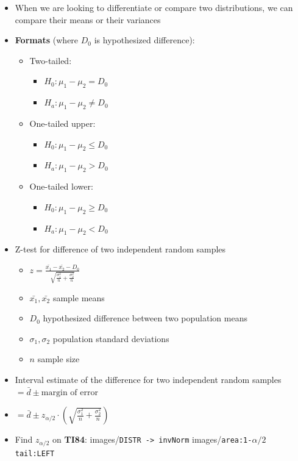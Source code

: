 \documentclass{article}
\newcommand{\code}[1]{images/\colorbox{light-gray}{\texttt{#1}}}
\begin{document}
\begin{itemize}
    \item When we are looking to differentiate or compare two distributions, we can compare their means or their variances
    \item \textbf{Formats} (where $D_0$ is hypothesized difference):
    \begin{itemize}
        \item Two-tailed:
        \begin{itemize}
            \item $H_0: \mu_1 - \mu_2 = D_0$
            \item $H_a: \mu_1 - \mu_2 \ne D_0$
        \end{itemize}
        \item One-tailed upper:
        \begin{itemize}
            \item $H_0: \mu_1 - \mu_2 \leq D_0$
            \item $H_a: \mu_1 - \mu_2 > D_0$
        \end{itemize}
        \item One-tailed lower:
        \begin{itemize}
            \item $H_0: \mu_1 - \mu_2 \geq D_0$
            \item $H_a: \mu_1 - \mu_2 < D_0$
        \end{itemize}
    \end{itemize}
     \item Z-test for difference of two independent random samples
    \begin{itemize}
        \item $z=\frac{\bar{x_1} - \bar{x_2} - D_0}{\sqrt{\frac{\sigma_1^2}{n}+\frac{\sigma_2^2}{n}}}$
        \item $\bar{x_1}, \bar{x_2}$ sample means
        \item $D_0$ hypothesized difference between two population means
        \item $\sigma_1, \sigma_2$ population standard deviations
        \item $n$ sample size
    \end{itemize}
    \item Interval estimate of the difference for two independent random samples $=\bar{d} \pm \text{margin of error}$
    \item $=\bar{d} \pm z_{\alpha/2} \cdot (\sqrt{\frac{\sigma_1^2}{n}+\frac{\sigma_2^2}{n}})$
    \item Find $z_{\alpha/2}$ on \textbf{TI84}: \code{DISTR -> invNorm} \code{area:1-$\alpha/2$ tail:LEFT}
\end{itemize}
\end{document}
